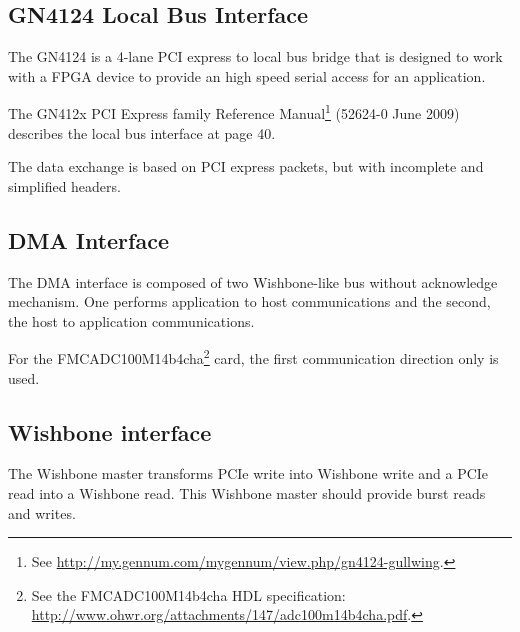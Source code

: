 \documentclass[10pt,a4paper]{cerndoc}
\begin{document}
    \subsection{GN4124 Local Bus Interface}
    
The GN4124 is a 4-lane PCI express to local bus bridge that is designed to work with a FPGA device to provide an high speed serial access for an application.
    
The GN412x PCI Express family Reference Manual\footnote{See \href{http://my.gennum.com/mygennum/view.php/gn4124-gullwing}{http://my.gennum.com/mygennum/view.php/gn4124-gullwing}.} (52624-0 June 2009) describes the local bus interface at page 40.

The data exchange is based on PCI express packets, but with incomplete and simplified headers.
    
    \subsection{DMA Interface}
The DMA interface is composed of two Wishbone-like bus without acknowledge mechanism. One performs application to host communications and the second, the  host to application communications.



For the FMCADC100M14b4cha\footnote{See the FMCADC100M14b4cha HDL specification: \href{http://www.ohwr.org/attachments/147/adc100m14b4cha.pdf}{http://www.ohwr.org/attachments/147/adc100m14b4cha.pdf}.} card, the first communication direction only is used. 
    
    
    \subsection{Wishbone interface}
    The Wishbone master transforms PCIe write into Wishbone write and a PCIe read into a Wishbone read. This Wishbone master should provide burst reads and writes.
    
\end{document}
